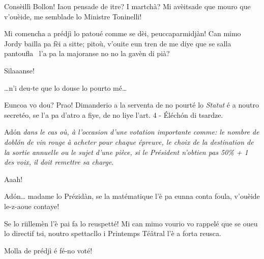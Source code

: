 \begin{drama}
\Dallasspeaks  Consèillì Bollon! Iaou pensade de itre? I mar\-tchà? Mi avèitsade que mouro que v'ouèide, me semblade lo Ministre Toninelli!

\Cimaspeaks {} Mi comencha a prédjì lo patoué comme se dèi, peuccaparmidjàn! Can mimo Jordy bailla pa fèi a sitte; pitoù, v'ouite eun tren de me diye que se salla pantoufla \pantoufla\ l'a pa la majoranse no no la gavèn di pià?


\Presidanspeaks{}  Silaaanse!


\Richardspeaks \ldots  n'i deu-te que lo douse lo pourto mé\ldots

\Presidanspeaks Euncoa vo dou? Prao! Dimanderio a la serventa de no pourté lo \textit{Statut} é a noutro secretéo, se l'a pa d'atro a fiye, de no liye l'art. 4 - \'Eléch\'on di tsardze.


\Secreteospeaks Ad\'on \og\textit{dans le cas où, à l’occasion d’une votation importante comme: le nombre de \og dobl\'on \fg de vin rouge à acheter pour chaque épreuve, le choix de la destination de la sortie annuelle ou le sujet d’une pièce, si le Président n’obtien pas 50\% + 1 des voix, il doit remettre sa charge}\fg.

\Sophiespeaks Aaah! 


\Jordyspeaks Ad\'on\ldots {}  madame lo Prézidàn, se la matématique l'è pa eunna conta foula, v'ouèide le-z-aoue contaye!

\Presidanspeaks {} Se lo riillemèn l'è pai fa lo reuspetté! Mi can mimo vourio vo rappelé que se oueu lo directif tsi, noutro spettacllo i Printemps Té\^atral l'è a forta reusca.

\Marcospeaks Molla de prédjì é fé-no voté!


\end{drama}
